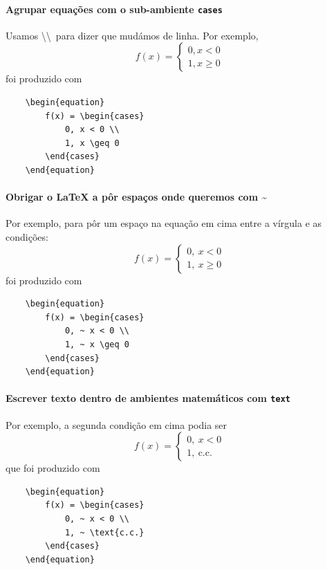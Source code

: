 \documentclass[11pt]{article}
\begin{document}
\paragraph{Agrupar equações com o sub-ambiente \texttt{cases}}
Usamos \textbackslash\textbackslash~para dizer que mudámos de linha. Por exemplo,
\begin{equation}
    f(x) = \begin{cases}
        0, x < 0 \\
        1, x \geq 0
    \end{cases}
\end{equation}
foi produzido com
\begin{verbatim}
    \begin{equation}
        f(x) = \begin{cases}
            0, x < 0 \\
            1, x \geq 0
        \end{cases}
    \end{equation}
\end{verbatim}

\paragraph{Obrigar o LaTeX a pôr espaços onde queremos com \textasciitilde}
Por exemplo, para pôr um espaço na equação em cima entre a vírgula e as condições:
\begin{equation}
    f(x) = \begin{cases}
        0, ~ x < 0 \\
        1, ~ x \geq 0
    \end{cases}
\end{equation}
foi produzido com
\begin{verbatim}
    \begin{equation}
        f(x) = \begin{cases}
            0, ~ x < 0 \\
            1, ~ x \geq 0
        \end{cases}
    \end{equation}
\end{verbatim}

\paragraph{Escrever texto dentro de ambientes matemáticos com \texttt{text}}
Por exemplo, a segunda condição em cima podia ser
\begin{equation}
    f(x) = \begin{cases}
        0, ~ x < 0 \\
        1, ~ \text{c.c.}
    \end{cases}
\end{equation}
que foi produzido com
\begin{verbatim}
    \begin{equation}
        f(x) = \begin{cases}
            0, ~ x < 0 \\
            1, ~ \text{c.c.}
        \end{cases}
    \end{equation}
\end{verbatim}
\end{document}

